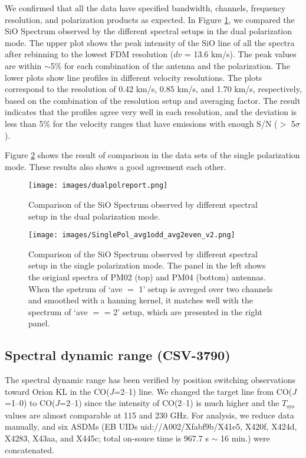 We confirmed that all the data have specified bandwidth, channels, frequency resolution, and polarization products as expected. 
In Figure \ref{fig:Linedual}, we compared the SiO Spectrum observed by the different spectral setups in the dual polarization mode. The upper plot shows the peak intensity of the SiO line of all the spectra after rebinning to the lowest FDM resolution ($dv$ = 13.6 km/s). The peak values are within $\sim$5\% for each combination of the antenna and the polarization. The lower plots show line profiles in different velocity resolutions. The plots correspond to the resolution of 0.42 km/s, 0.85 km/s, and 1.70 km/s, respectively, based on the combination of the resolution setup and averaging factor. The result indicates that the profiles agree very well in each resolution, and the deviation is less than 5\% for the velocity ranges that have emissions with enough S/N ($>$ 5$\sigma$).   

Figure \ref{fig:Linesingle} shows the result of comparison in the data sets of the single polarization mode. These results also shows a good agreement each other.  


\begin{figure}[htbp]
     \centering
     \texttt{[image: images/dualpolreport.png]}
     \caption{Comparison of the SiO Spectrum observed by different spectral setup in the dual polarization mode.}
     \label{fig:Linedual}
\end{figure}

\begin{figure}[htbp]
     \centering
     \texttt{[image: images/SinglePol\_avg1odd\_avg2even\_v2.png]}
     \caption{Comparison of the SiO Spectrum observed by different spectral setup in the single polarization mode.
     The panel in the left shows the origianl spectra of PM02 (top) and PM04 (bottom) antennas.
     When the spetrum of `ave $=$ 1' setup is avreged over two channels and smoothed with a hanning kernel,
     it matches well with the spectrum of `ave $=$ = 2' setup, which are presented in the right panel.}
     \label{fig:Linesingle}
\end{figure}


\subsection{Spectral dynamic range (CSV-3790)}
The spectral dynamic range has been verified by position switching observations toward Orion KL in the CO($J$=2--1) line. We changed the target line from CO($J$=1--0) to CO($J$=2--1) since the intensity of CO(2--1) is much higher and the $T_{\mathrm{sys}}$ values are almost comparable at 115 and 230 GHz. For analysis,  we  reduce data manually, and six ASDMs (EB UIDs uid://A002/Xfabf9b/X41e5, X420f, X424d, X4283, X43aa, and X445c; total on-souce time is 967.7 s $\sim$ 16 min.) were concatenated.

